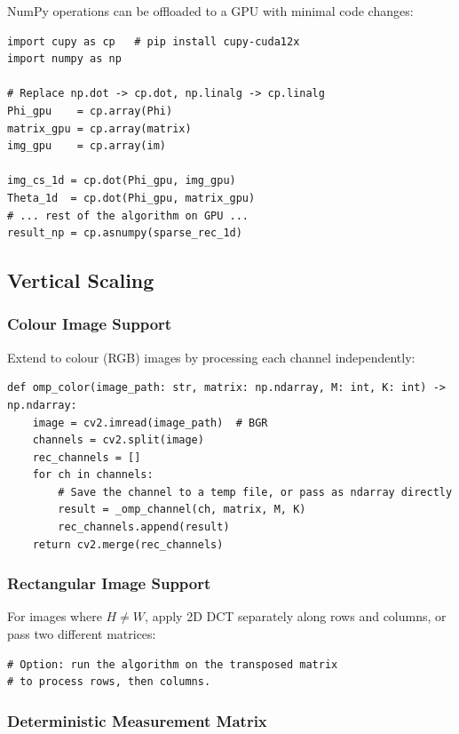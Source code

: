 \documentclass[12pt,a4paper]{article}
\begin{document}
NumPy operations can be offloaded to a GPU with minimal code changes:

\begin{lstlisting}[style=python]
import cupy as cp   # pip install cupy-cuda12x
import numpy as np

# Replace np.dot -> cp.dot, np.linalg -> cp.linalg
Phi_gpu    = cp.array(Phi)
matrix_gpu = cp.array(matrix)
img_gpu    = cp.array(im)

img_cs_1d = cp.dot(Phi_gpu, img_gpu)
Theta_1d  = cp.dot(Phi_gpu, matrix_gpu)
# ... rest of the algorithm on GPU ...
result_np = cp.asnumpy(sparse_rec_1d)
\end{lstlisting}

\subsection{Vertical Scaling}

\subsubsection{Colour Image Support}

Extend to colour (RGB) images by processing each channel independently:

\begin{lstlisting}[style=python]
def omp_color(image_path: str, matrix: np.ndarray, M: int, K: int) -> np.ndarray:
    image = cv2.imread(image_path)  # BGR
    channels = cv2.split(image)
    rec_channels = []
    for ch in channels:
        # Save the channel to a temp file, or pass as ndarray directly
        result = _omp_channel(ch, matrix, M, K)
        rec_channels.append(result)
    return cv2.merge(rec_channels)
\end{lstlisting}

\subsubsection{Rectangular Image Support}

For images where $H \neq W$, apply 2D DCT separately along rows and columns,
or pass two different matrices:

\begin{lstlisting}[style=python]
# Option: run the algorithm on the transposed matrix
# to process rows, then columns.
\end{lstlisting}

\subsubsection{Deterministic Measurement Matrix}
\end{document}
